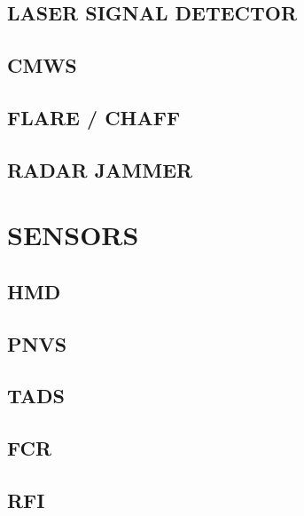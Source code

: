 \documentclass[fontInter]{TechCheck}
\begin{document}
	\clearpage 

	\section{LASER SIGNAL DETECTOR}

	\clearpage 

	\section{CMWS}

	\clearpage 

	\section{FLARE / CHAFF}

	\clearpage 

	\section{RADAR JAMMER}

	\cleardoublepage
	

	\chapter{SENSORS}
	\minitoc
	\cleardoublepage

	\section{HMD}

	\clearpage 

	\section{PNVS}

	\clearpage

	\section{TADS}

	\clearpage

	\section{FCR}

	\clearpage 

	\section{RFI}
\end{document}
